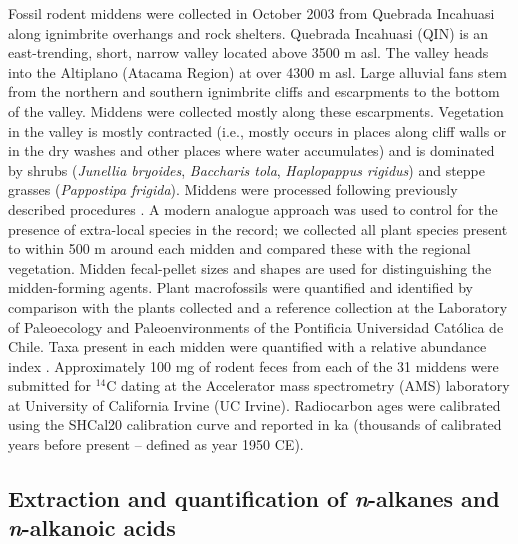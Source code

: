 \documentclass[
  authoryear,
  preprint,
  3p]{elsarticle}
\begin{document}
Fossil rodent middens were collected in October 2003 from Quebrada
Incahuasi along ignimbrite overhangs and rock shelters. Quebrada
Incahuasi (QIN) is an east-trending, short, narrow valley located above
3500 m asl. The valley heads into the Altiplano (Atacama Region) at over
4300 m asl. Large alluvial fans stem from the northern and southern
ignimbrite cliffs and escarpments to the bottom of the valley. Middens
were collected mostly along these escarpments. Vegetation in the valley
is mostly contracted (i.e., mostly occurs in places along cliff walls or
in the dry washes and other places where water accumulates) and is
dominated by shrubs (\emph{Junellia bryoides}, \emph{Baccharis tola},
\emph{Haplopappus rigidus}) and steppe grasses (\emph{Pappostipa
frigida}). Middens were processed following previously described
procedures
\citep{betancourt22000YearRecord2000, betancourtPaleomadriguerasRoedoresNuevo2002, latorreVegetationInvasionsAbsolute2002}.
A modern analogue approach was used to control for the presence of
extra-local species in the record; we collected all plant species
present to within 500 m around each midden and compared these with the
regional vegetation. Midden fecal-pellet sizes and shapes are used for
distinguishing the midden-forming agents. Plant macrofossils were
quantified and identified by comparison with the plants collected and a
reference collection at the Laboratory of Paleoecology and
Paleoenvironments of the Pontificia Universidad Católica de Chile. Taxa
present in each midden were quantified with a relative abundance index
\citep[where 0 is absent and 5 is
dominant,][]{spaulding1990vegetational}. Approximately 100 mg of rodent
feces from each of the 31 middens were submitted for \(^{14}\)C dating
at the Accelerator mass spectrometry (AMS) laboratory at University of
California Irvine (UC Irvine). Radiocarbon ages were calibrated using
the SHCal20 calibration curve \citep{hogg_heaton_2020} and reported in
ka (thousands of calibrated years before present -- defined as year 1950
CE).

\hypertarget{extraction-and-quantification-of-n-alkanes-and-n-alkanoic-acids}{%
\subsection{\texorpdfstring{Extraction and quantification of
\emph{n}-alkanes and \emph{n}-alkanoic
acids}{Extraction and quantification of n-alkanes and n-alkanoic acids}}\label{extraction-and-quantification-of-n-alkanes-and-n-alkanoic-acids}}
\end{document}
